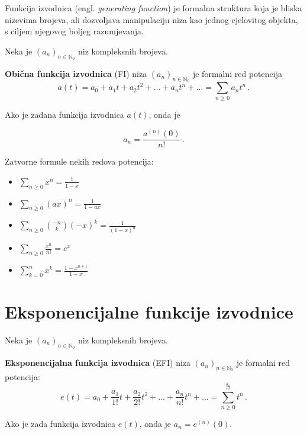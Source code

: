 Funkcija izvodnica (engl. \textit{generating function}) je formalna struktura
koja je bliska nizevima brojeva, ali dozvoljava manipulaciju niza kao jednog
cjelovitog objekta, s ciljem njegovog boljeg razumjevanja.

\begin{definition}
    Neka je $(a_n)_{n\in\mathbb{N}_0}$ niz kompleksnih brojeva.
    
    \textbf{Obična funkcija izvodnica} (FI) niza $(a_n)_{n\in\mathbb{N}_0}$ je formalni red potencija
    $$
        a(t) = a_0 + a_1t+a_2t^2 + \dots + a_nt^n+\dots = \sum_{n \geq 0} a_nt^n\,.
    $$
\end{definition}

Ako je zadana funkcija izvodnica $a(t)$, onda je

$$
a_n = \frac{a^{(n)}(0)}{n!}\,.
$$

Zatvorne formule nekih redova potencija:

\begin{itemize}
    \item $\displaystyle \sum_{n\geq 0} x^n = \frac{1}{1-x}$
    \item $\displaystyle \sum_{n\geq 0} (ax)^n = \frac{1}{1-ax}$
    \item $\displaystyle \sum_{n\geq 0} \binom{-n}{k}(-x)^k = \frac{1}{(1-x)^n}$
    \item $\displaystyle \sum_{n\geq 0} \frac{x^n}{n!} = e^x$
    \item $\displaystyle \sum_{k=0}^{n}x^k = \frac{1-x^{n+1}}{1-x}$
\end{itemize}

\section{Eksponencijalne funkcije izvodnice}

\begin{definition}
    Neka je $(a_n)_{n \in \mathbb{N}_0}$ niz kompleksnih brojeva.
    
    \textbf{Eksponencijalna funkcija izvodnica} (EFI) niza $(a_n)_{n \in \mathbb{N}_0}$ je formalni red potencija:
    $$
        e(t) = a_0+\frac{a_1}{1!}t + \frac{a_2}{2!}t^2 + \dots + \frac{a_n}{n!}t^n + \dots = \sum_{n\geq 0}^ \frac{a_n}{n!}t^n\,.
    $$
\end{definition}

Ako je zada funkcija izvodnica $e(t)$, onda je $a_n = e^{(n)}(0)$.


